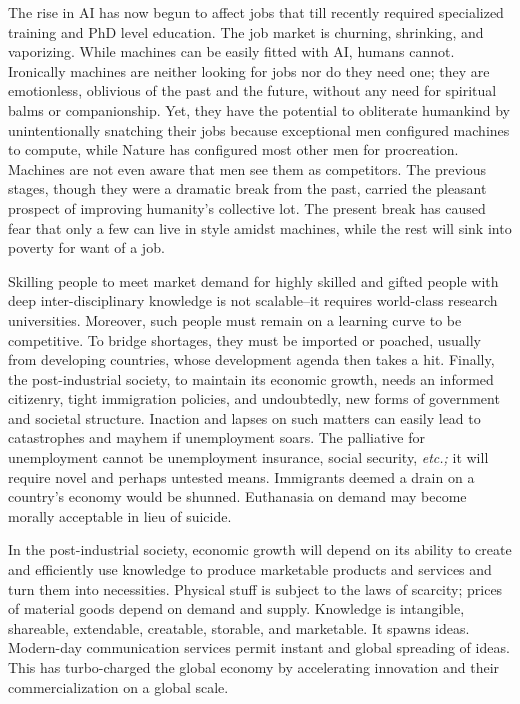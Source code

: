 \begin{multicols}{2}
The rise in AI has now begun to affect jobs that till recently required specialized training and PhD level education. The job market is churning, shrinking, and vaporizing. While machines can be easily fitted with AI, humans cannot. Ironically machines are neither looking for jobs nor do they need one; they are emotionless, oblivious of the past and the future, without any need for spiritual balms or companionship. Yet, they have the potential to obliterate humankind by unintentionally snatching their jobs because exceptional men configured machines to compute, while Nature has configured most other men for procreation. Machines are not even aware that men see them as competitors. The previous stages, though they were a dramatic break from the past, carried the pleasant prospect of improving humanity's collective lot. The present break has caused fear that only a few can live in style amidst machines, while the rest will sink into poverty for want of a job. 

Skilling people to meet market demand for highly skilled and gifted people with deep inter-disciplinary knowledge is not scalable--it requires world-class research universities. Moreover, such people must remain on a learning curve to be competitive. To bridge shortages, they must be imported or poached, usually from developing countries, whose development agenda then takes a hit. Finally, the post-industrial society, to maintain its economic growth, needs an informed citizenry, tight immigration policies, and undoubtedly, new forms of government and societal structure. Inaction and lapses on such matters can easily lead to catastrophes and mayhem if unemployment soars. The palliative for unemployment cannot be unemployment insurance, social security, \textit{etc.;} it will require novel and perhaps untested means. Immigrants deemed a drain on a country's economy would be shunned. Euthanasia on demand may become morally acceptable in lieu of suicide.

In the post-industrial society, economic growth will depend on its ability to create and efficiently use knowledge to produce marketable products and services and turn them into necessities. Physical stuff is subject to the laws of scarcity; prices of material goods depend on demand and supply. Knowledge is intangible, shareable, extendable, creatable, storable, and marketable. It spawns ideas. Modern-day communication services permit instant and global spreading of ideas. This has turbo-charged the global economy by accelerating innovation and their commercialization on a global scale.


\end{multicols}
